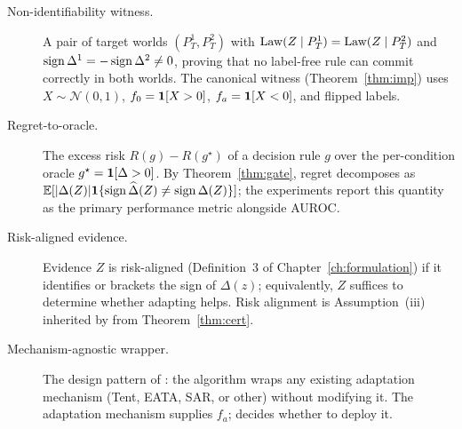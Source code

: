 \begin{description}
\item[Non-identifiability witness.]
  A pair of target worlds $(P_T^1, P_T^2)$ with $\mathrm{Law}(Z \mid P_T^1) = \mathrm{Law}(Z
  \mid P_T^2)$ and $\operatorname{sign}\Delta^1 = -\operatorname{sign}\Delta^2 \neq 0$, proving that no
  label-free rule can commit correctly in both worlds.  The canonical witness
  (Theorem~\ref{thm:imp}) uses $X \sim \mathcal{N}(0,1)$, $f_0 = \mathbf{1}[X > 0]$,
  $f_a = \mathbf{1}[X < 0]$, and flipped labels.

\item[Regret-to-oracle.]
  The excess risk $R(g) - R(g^\star)$ of a decision rule $g$ over the
  per-condition oracle $g^\star = \mathbf{1}[\Delta > 0]$.  By
  Theorem~\ref{thm:gate}, regret decomposes as
  $\mathbb{E}[|\Delta(Z)| \mathbf{1}\{\operatorname{sign}\widehat\Delta(Z) \neq \operatorname{sign}\Delta(Z)\}]$;
  the experiments report this quantity as the primary performance metric
  alongside AUROC.

\item[Risk-aligned evidence.]
  Evidence $Z$ is risk-aligned (Definition~3 of Chapter~\ref{ch:formulation})
  if it identifies or brackets the sign of $\Delta(z)$; equivalently, $Z$
  suffices to determine whether adapting helps.  Risk alignment is Assumption~(iii)
  inherited by \KGA{} from Theorem~\ref{thm:cert}.

\item[Mechanism-agnostic wrapper.]
  The design pattern of \KGA{}: the algorithm wraps any existing adaptation
  mechanism (Tent, EATA, SAR, or other) without modifying it.  The
  adaptation mechanism supplies $f_a$; \KGA{} decides whether to deploy it.

\end{description}